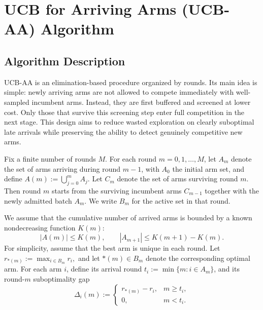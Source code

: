 \documentclass[
  12pt]{article}
\begin{document}



\section{UCB for Arriving Arms (UCB-AA) Algorithm}
\label{sec:algorithm}





\subsection{Algorithm Description}



UCB-AA is an elimination-based procedure organized by rounds. Its main idea is simple:
newly arriving arms are not allowed to compete immediately with well-sampled incumbent
arms. Instead, they are first buffered and screened at lower cost. Only those that survive
this screening step enter full competition in the next stage. This design aims to reduce
wasted exploration on clearly suboptimal late arrivals while preserving the ability to detect
genuinely competitive new arms.

Fix a finite number of rounds \(M\). For each round \(m=0,1,\dots,M\), let \(A_m\) denote
the set of arms arriving during round \(m-1\), with \(A_0\) the initial arm set, and define
\(
A(m):=\bigcup_{j=0}^m A_j .
\)
Let \(C_m\) denote the set of arms surviving round \(m\). Then round \(m\) starts from the
surviving incumbent arms \(C_{m-1}\) together with the newly admitted batch \(A_m\).
We write \(B_m\) for the active set in that round.

We assume that the cumulative number of arrived arms is bounded by a known nondecreasing
function \(K(m)\):
\[
|A(m)| \le K(m), \qquad |A_{m+1}| \le K(m+1)-K(m).
\]
For simplicity, assume that the best arm is unique in each round. Let
\(
r_{*(m)}:=\max_{i\in B_m} r_i,
\)
and let \(*(m)\in B_m\) denote the corresponding optimal arm. For each arm \(i\), define
its arrival round $t_i:=\min\{m:i\in A_m\}$, and its round-\(m\) suboptimality gap
\[
\Delta_i(m):=
\begin{cases}
r_{*(m)}-r_i, & m\ge t_i,\\
0, & m<t_i.
\end{cases}
\]
\end{document}
